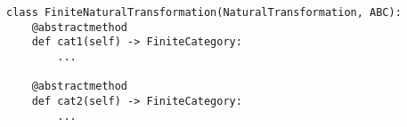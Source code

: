 \par\begin{minipage}{62ex}
\begin{verbatim}
class FiniteNaturalTransformation(NaturalTransformation, ABC):
    @abstractmethod
    def cat1(self) -> FiniteCategory:
        ...

    @abstractmethod
    def cat2(self) -> FiniteCategory:
        ...
\end{verbatim}
\end{minipage}\par